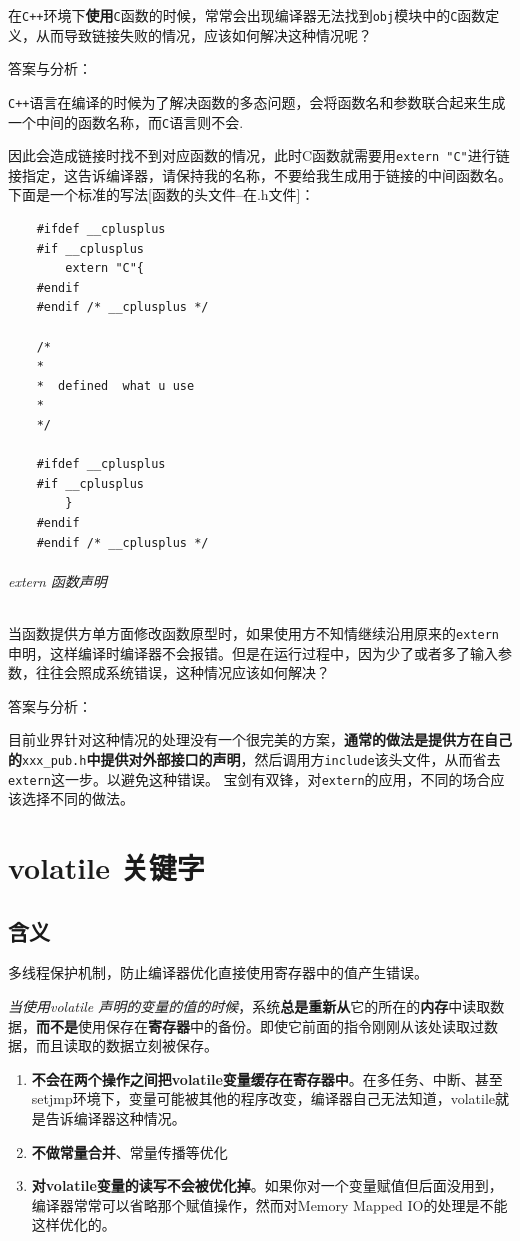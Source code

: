 \documentclass[UTF8,a4paper,12pt]{ctexbook} %
\begin{document}
		        在\verb|C++|环境下\textbf{使用}\verb|C|函数的时候，常常会出现编译器无法找到\verb|obj|模块中的\verb|C|函数定义，从而导致链接失败的情况，应该如何解决这种情况呢？
	        
		        答案与分析：
		        
		        \verb|C++|语言在编译的时候为了解决函数的多态问题，会将函数名和参数联合起来生成一个中间的函数名称，而\verb|C|语言则不会.
		        
		        因此会造成链接时找不到对应函数的情况，此时C函数就需要用\verb|extern "C"|进行链接指定，这告诉编译器，请保持我的名称，不要给我生成用于链接的中间函数名。
		        下面是一个标准的写法[函数的头文件--在.h文件]：
		        \begin{lstlisting}
	#ifdef __cplusplus
	#if __cplusplus
		extern "C"{
	#endif
	#endif /* __cplusplus */ 
	
	/*
	*
	*  defined  what u use
	*
	*/
	
	#ifdef __cplusplus
	#if __cplusplus
		}
	#endif
	#endif /* __cplusplus */ 	        
		        \end{lstlisting}
        
	        \subparagraph{extern 函数声明} 当函数提供方单方面修改函数原型时，如果使用方不知情继续沿用原来的\verb|extern|申明，这样编译时编译器不会报错。但是在运行过程中，因为少了或者多了输入参数，往往会照成系统错误，这种情况应该如何解决？
	        
	        答案与分析：
	        
	        目前业界针对这种情况的处理没有一个很完美的方案，\textbf{通常的做法是提供方在自己的}\verb|xxx_pub.h|\textbf{中提供对外部接口的声明}，然后调用方\verb|include|该头文件，从而省去\verb|extern|这一步。以避免这种错误。
	        宝剑有双锋，对\verb|extern|的应用，不同的场合应该选择不同的做法。
	      
\chapter{volatile 关键字}
	\section{含义}
			多线程保护机制，防止编译器优化直接使用寄存器中的值产生错误。
	
			\textit{当使用volatile 声明的变量的值的时候}，系统\textbf{总是重新从}它的所在的\textbf{内存}中读取数据，\textbf{而不是}使用保存在\textbf{寄存器}中的备份。即使它前面的指令刚刚从该处读取过数据，而且读取的数据立刻被保存。
		\begin{enumerate}
			\item \textbf{不会在两个操作之间把volatile变量缓存在寄存器中}。在多任务、中断、甚至setjmp环境下，变量可能被其他的程序改变，编译器自己无法知道，volatile就是告诉编译器这种情况。
			\item \textbf{不做常量合并}、常量传播等优化
			\item \textbf{对volatile变量的读写不会被优化掉}。如果你对一个变量赋值但后面没用到，编译器常常可以省略那个赋值操作，然而对Memory Mapped IO的处理是不能这样优化的。
		\end{enumerate}
			  
\end{document}
